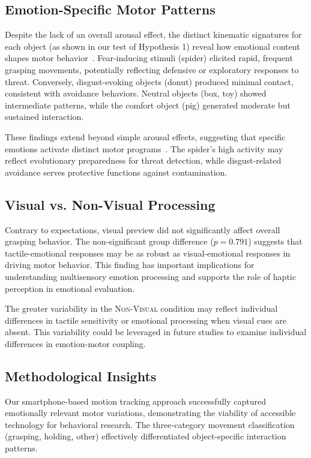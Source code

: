 \documentclass[conference]{IEEEtran}
\begin{document}
\subsection{Emotion-Specific Motor Patterns}

Despite the lack of an overall arousal effect, the distinct kinematic signatures for each object (as shown in our test of Hypothesis 1) reveal how emotional content shapes motor behavior~\cite{emotion_motor2021}. Fear-inducing stimuli (spider) elicited 
rapid, frequent grasping movements, potentially reflecting defensive or 
exploratory responses to threat. Conversely, disgust-evoking objects (donut) 
produced minimal contact, consistent with avoidance behaviors. Neutral 
objects (box, toy) showed intermediate patterns, while the comfort object 
(pig) generated moderate but sustained interaction.

These findings extend beyond simple arousal effects, suggesting that 
specific emotions activate distinct motor programs~\cite{embodied_emotion2022}. The spider's high 
activity may reflect evolutionary preparedness for threat detection, 
while disgust-related avoidance serves protective functions against 
contamination.

\subsection{Visual vs. Non-Visual Processing}

Contrary to expectations, visual preview did not significantly affect 
overall grasping behavior. The non-significant group difference 
($p = 0.791$) suggests that tactile-emotional responses may be as 
robust as visual-emotional responses in driving motor behavior. This 
finding has important implications for understanding multisensory 
emotion processing and supports the role of haptic perception in 
emotional evaluation.

The greater variability in the \textsc{Non-Visual} condition may reflect 
individual differences in tactile sensitivity or emotional processing 
when visual cues are absent. This variability could be leveraged in 
future studies to examine individual differences in emotion-motor coupling.

\subsection{Methodological Insights}

Our smartphone-based motion tracking approach successfully captured 
emotionally relevant motor variations, demonstrating the viability of 
accessible technology for behavioral research. The three-category 
movement classification (grasping, holding, other) effectively 
differentiated object-specific interaction patterns.
\end{document}
